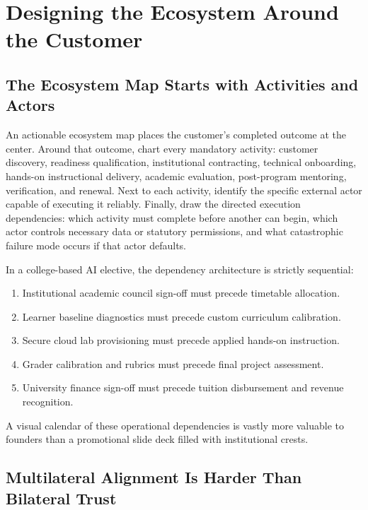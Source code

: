 \section{Designing the Ecosystem Around the Customer}
\label{sec:ch30_designing_ecosystem_around_customer}

\subsection{The Ecosystem Map Starts with Activities and Actors}
\label{sec:ecosystem_map_activities_actors}

An actionable ecosystem map places the customer's completed outcome at the center. Around that outcome, chart every mandatory activity: customer discovery, readiness qualification, institutional contracting, technical onboarding, hands-on instructional delivery, academic evaluation, post-program mentoring, verification, and renewal. Next to each activity, identify the specific external actor capable of executing it reliably. Finally, draw the directed execution dependencies: which activity must complete before another can begin, which actor controls necessary data or statutory permissions, and what catastrophic failure mode occurs if that actor defaults.

In a college-based AI elective, the dependency architecture is strictly sequential:
\begin{enumerate}
\item Institutional academic council sign-off must precede timetable allocation.
\item Learner baseline diagnostics must precede custom curriculum calibration.
\item Secure cloud lab provisioning must precede applied hands-on instruction.
\item Grader calibration and rubrics must precede final project assessment.
\item University finance sign-off must precede tuition disbursement and revenue recognition.
\end{enumerate}
A visual calendar of these operational dependencies is vastly more valuable to founders than a promotional slide deck filled with institutional crests.

\subsection{Multilateral Alignment Is Harder Than Bilateral Trust}
\label{sec:multilateral_alignment_versus_bilateral_trust}

